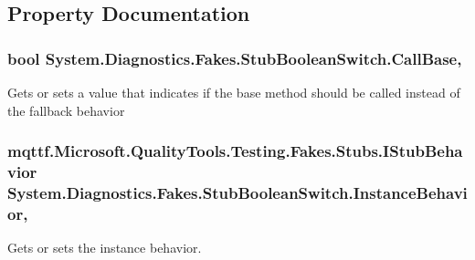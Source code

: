 \subsection{Property Documentation}
\hypertarget{class_system_1_1_diagnostics_1_1_fakes_1_1_stub_boolean_switch_a7879fafd8a5171e51cb18b8e943c118b}{
\subsubsection[{Call\-Base}]{\setlength{\rightskip}{0pt plus 5cm}bool System.\-Diagnostics.\-Fakes.\-Stub\-Boolean\-Switch.\-Call\-Base\hspace{0.3cm}{\ttfamily [get]}, {\ttfamily [set]}}}\label{class_system_1_1_diagnostics_1_1_fakes_1_1_stub_boolean_switch_a7879fafd8a5171e51cb18b8e943c118b}


Gets or sets a value that indicates if the base method should be called instead of the fallback behavior

\hypertarget{class_system_1_1_diagnostics_1_1_fakes_1_1_stub_boolean_switch_a5c4a2d238b5ef78f8dcf80a9bc6cf061}{
\subsubsection[{Instance\-Behavior}]{\setlength{\rightskip}{0pt plus 5cm}mqttf.\-Microsoft.\-Quality\-Tools.\-Testing.\-Fakes.\-Stubs.\-I\-Stub\-Behavior System.\-Diagnostics.\-Fakes.\-Stub\-Boolean\-Switch.\-Instance\-Behavior\hspace{0.3cm}{\ttfamily [get]}, {\ttfamily [set]}}}\label{class_system_1_1_diagnostics_1_1_fakes_1_1_stub_boolean_switch_a5c4a2d238b5ef78f8dcf80a9bc6cf061}


Gets or sets the instance behavior.

